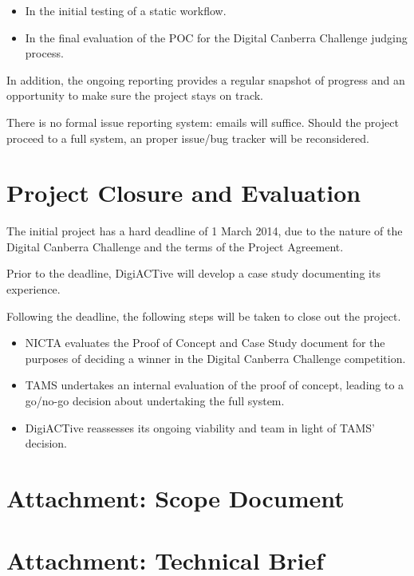 \documentclass[12pt,a4paper,twosided]{article}
\begin{document}
\begin{itemize}
\itemsep1pt\parskip0pt
\item
  In the initial testing of a static workflow.
\item
  In the final evaluation of the POC for the Digital Canberra Challenge
  judging process.
\end{itemize}

In addition, the ongoing reporting provides a regular snapshot of
progress and an opportunity to make sure the project stays on track.

There is no formal issue reporting system: emails will suffice. Should
the project proceed to a full system, an proper issue/bug tracker will
be reconsidered.

\section{Project Closure and Evaluation}

The initial project has a hard deadline of 1 March 2014, due to the
nature of the Digital Canberra Challenge and the terms of the Project
Agreement.

Prior to the deadline, DigiACTive will develop a case study documenting
its experience.

Following the deadline, the following steps will be taken to close out
the project.

\begin{itemize}
\itemsep1pt\parskip0pt
\item
  NICTA evaluates the Proof of Concept and Case Study document for the
  purposes of deciding a winner in the Digital Canberra Challenge
  competition.
\item
  TAMS undertakes an internal evaluation of the proof of concept,
  leading to a go/no-go decision about undertaking the full system.
\item
  DigiACTive reassesses its ongoing viability and team in light of TAMS'
  decision.
\end{itemize}

\section{Attachment: Scope Document}



\section{Attachment: Technical Brief}
\end{document}

